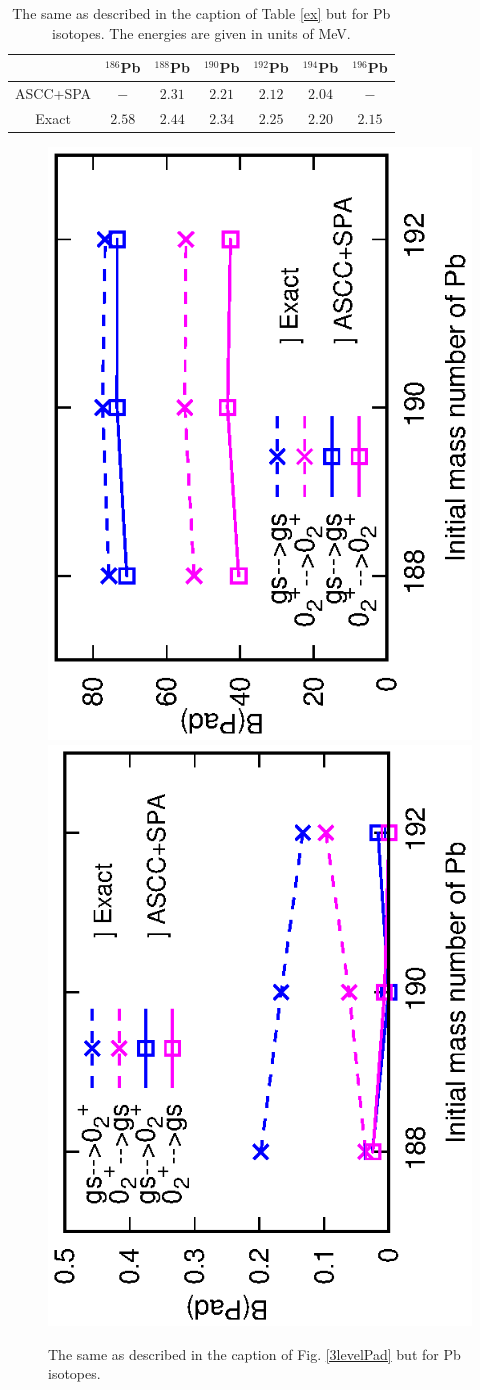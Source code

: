 \documentclass[11pt]{book} %
\begin{document}
\begin{table}[bt]
\begin{center}
\caption{The same as described in the caption of Table \ref{ex} but for Pb isotopes. The energies are given in units of MeV.}
\begin{tabular}{c|cccccc}
  \toprule
   & ${}^{186}$Pb & ${}^{188}$Pb & ${}^{190}$Pb & ${}^{192}$Pb & ${}^{194}$Pb & ${}^{196}$Pb\\ \hline
ASCC+SPA & $-$ & $2.31$ & $2.21$ & $2.12$ & $2.04$ & $-$ \\ 
Exact & $2.58$ & $2.44$ & $2.34$ & $2.25$ & $2.20$ & $2.15$ \\
  \bottomrule
\end{tabular}
\label{Pb_ex}
\end{center}
\end{table}
\begin{figure}[htb]
 \begin{minipage}{1\hsize}
 \begin{center}
  \includegraphics[height=0.45\textwidth,angle=-90]{images/Pbintra_trans.eps}
  \includegraphics[height=0.45\textwidth,angle=-90]{images/Pbinter_trans.eps}
 \end{center}
 \end{minipage}
	\caption{The same as described in the caption of Fig. \ref{3levelPad} but for Pb isotopes.
}
 \label{PbPad}
\end{figure}
\end{document}
